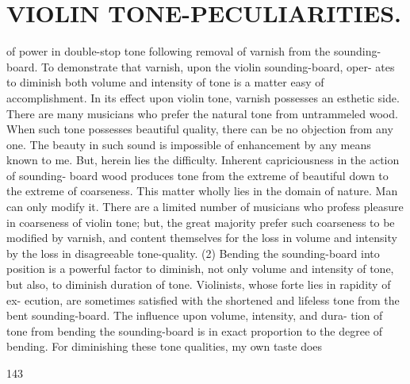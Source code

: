 \documentclass{article}
\begin{document}
\section*{VIOLIN TONE-PECULIARITIES.}
of power in double-stop tone following removal of varnish from the sounding-board. To demonstrate that varnish, upon the violin sounding-board, oper- ates to diminish both volume and intensity of tone is a matter easy of accomplishment. In its effect upon violin tone, varnish possesses an esthetic side. There are many musicians who prefer the natural tone from untrammeled wood. When such tone possesses beautiful quality, there can be no objection from any one. The beauty in such sound is impossible of enhancement by any means known to me. But, herein lies the difficulty. Inherent capriciousness in the action of sounding- board wood produces tone from the extreme of beautiful down to the extreme of coarseness. This matter wholly lies in the domain of nature. Man can only modify it. There are a limited number of musicians who profess pleasure in coarseness of violin tone; but, the great majority prefer such coarseness to be modified by varnish, and content themselves for the loss in volume and intensity by the loss in disagreeable tone-quality. (2) Bending the sounding-board into position is a powerful factor to diminish, not only volume and intensity of tone, but also, to diminish duration of tone. Violinists, whose forte lies in rapidity of ex- ecution, are sometimes satisfied with the shortened and lifeless tone from the bent sounding-board. The influence upon volume, intensity, and dura- tion of tone from bending the sounding-board is in exact proportion to the degree of bending. For diminishing these tone qualities, my own taste does

143
\end{document}
